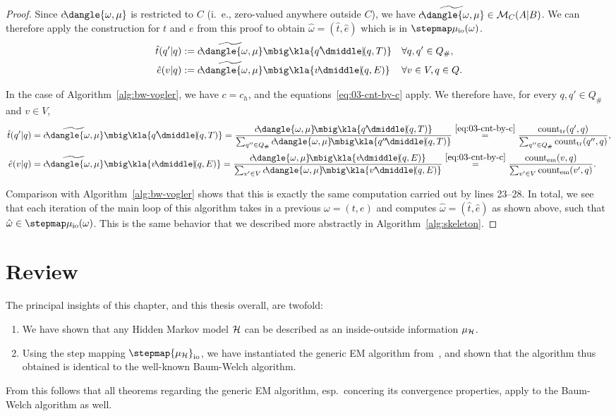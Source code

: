 \begin{proof}
Since $c\!\dangle{\omega,\mu}$ is restricted to $C$ (i.~e., zero-valued
anywhere outside $C$), we have
$\widetilde{c\!\dangle{\omega,\mu}}\in\um_C(A|B)$. We can therefore apply the
construction for $t$ and $e$ from this proof to obtain $\hat\omega=(\hat t,\hat
e)$ which is in $\stepmap\mu_\mathrm{io}(\omega)$.
\begin{align*}
 \hat t(q'|q) &:= \widetilde{c\!\dangle{\omega,\mu}}\mbig\kla{q'\npipe(q,T)} &&\forall q,q'\in Q_\#, \\
 \hat e(v|q) &:= \widetilde{c\!\dangle{\omega,\mu}}\mbig\kla{v\npipe(q,E)} &&\forall v\in V,q\in Q.
\end{align*}

In the case of Algorithm~\ref{alg:bw-vogler}, we have $c=c_h$, and the
equations~\eqref{eq:03-cnt-by-c} apply. We therefore have, for every $q,q'\in
Q_\#$ and $v\in V$,
\begin{align*}
 \hat t(q'|q)
 &= \widetilde{c\!\dangle{\omega,\mu}}\mbig\kla{q'\npipe(q,T)}
 = \frac{c\!\dangle{\omega,\mu}\!\mbig\kla{q'\npipe(q,T)}}{\sum_{q''\in Q_\#}c\!\dangle{\omega,\mu}\!\mbig\kla{q''\npipe(q,T)}}
 \overset{\eqref{eq:03-cnt-by-c}}= \frac{\cnt_\mathrm{tr}(q',q)}{\sum_{q''\in Q_\#} \cnt_\mathrm{tr}(q'',q)}, \\
 \hat e(v|q)
 &= \widetilde{c\!\dangle{\omega,\mu}}\mbig\kla{v\npipe(q,E)}
 = \frac{c\!\dangle{\omega,\mu}\!\mbig\kla{v\npipe(q,E)}}{\sum_{v'\in V}c\!\dangle{\omega,\mu}\!\mbig\kla{v'\npipe(q,E)}}
 \overset{\eqref{eq:03-cnt-by-c}}= \frac{\cnt_\mathrm{em}(v,q)}{\sum_{v'\in V} \cnt_\mathrm{em}(v',q)}.
\end{align*}

Comparison with Algorithm~\ref{alg:bw-vogler} shows that this is exactly the
same computation carried out by lines 23--28. In total, we see that each
iteration of the main loop of this algorithm takes in a previous
$\omega=(t,e)$ and computes $\hat\omega=(\hat t,\hat e)$ as shown above, such
that $\hat\omega\in\stepmap\mu_\mathrm{io}(\omega)$.  This is the same
behavior that we described more abstractly in Algorithm~\ref{alg:skeleton}.
\end{proof}

\section{Review}

The principal insights of this chapter, and this thesis overall, are twofold:
\begin{enumerate}
 \item We have shown that any Hidden Markov model $\mathcal H$ can be described as an
  inside-outside information $\mu_\mathcal H$.
 \item Using the step mapping $\stepmap{\mu_\uh}_\mathrm{io}$, we have
  instantiated the generic EM algorithm from~\cite{bucstuvog15}, and shown that
  the algorithm thus obtained is identical to the well-known Baum-Welch algorithm.
\end{enumerate}

From this follows that all theorems regarding the generic EM algorithm,
esp.~concering its convergence properties, apply to the Baum-Welch algorithm as
well.
